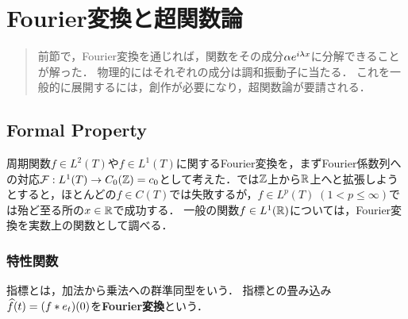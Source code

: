 \documentclass[uplatex,dvipdfmx]{jsreport}
\begin{document}
\chapter{Fourier変換と超関数論}

\begin{quotation}
    前節で，Fourier変換を通じれば，関数をその成分$\alpha e^{i\lambda x}$に分解できることが解った．
    物理的にはそれぞれの成分は調和振動子に当たる．
    これを一般的に展開するには，創作が必要になり，超関数論が要請される．
\end{quotation}

\section{Formal Property}

\begin{tcolorbox}[colframe=ForestGreen, colback=ForestGreen!10!white,breakable,colbacktitle=ForestGreen!40!white,coltitle=black,fonttitle=\bfseries\sffamily,
title=]
    周期関数$f\in L^2(T)$や$f\in L^1(T)$に関するFourier変換を，まずFourier係数列への対応$\mathcal{F}:L^1(T)\to C_0(\mathbb{Z})=c_0$として考えた．では$\mathbb{Z}$上から$\mathbb{R}$上へと拡張しようとすると，ほとんどの$f\in C(T)$では失敗するが，$f\in L^p(T)\;(1<p\le\infty)$では殆ど至る所の$x\in\mathbb{R}$で成功する．
    一般の関数$f\in L^1(\mathbb{R})$については，Fourier変換を実数上の関数として調べる．
\end{tcolorbox}

\subsection{特性関数}

\begin{tcolorbox}[colframe=ForestGreen, colback=ForestGreen!10!white,breakable,colbacktitle=ForestGreen!40!white,coltitle=black,fonttitle=\bfseries\sffamily,
title=]
    指標とは，加法から乗法への群準同型をいう．
    指標との畳み込み$\widehat{f}(t)=(f*e_t)(0)$を\textbf{Fourier変換}という．
\end{tcolorbox}
\end{document}
